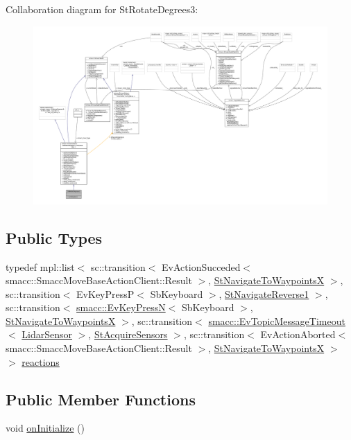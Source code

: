 Collaboration diagram for St\+Rotate\+Degrees3\+:
\nopagebreak
\begin{figure}[H]
\begin{center}
\leavevmode
\includegraphics[width=350pt]{structStRotateDegrees3__coll__graph}
\end{center}
\end{figure}
\subsection*{Public Types}
\begin{DoxyCompactItemize}
\item 
typedef mpl\+::list$<$ sc\+::transition$<$ Ev\+Action\+Succeded$<$ smacc\+::\+Smacc\+Move\+Base\+Action\+Client\+::\+Result $>$, \hyperlink{structStNavigateToWaypointsX}{St\+Navigate\+To\+WaypointsX} $>$, sc\+::transition$<$ Ev\+Key\+PressP$<$ Sb\+Keyboard $>$, \hyperlink{structStNavigateReverse1}{St\+Navigate\+Reverse1} $>$, sc\+::transition$<$ \hyperlink{structsmacc_1_1EvKeyPressN}{smacc\+::\+Ev\+Key\+PressN}$<$ Sb\+Keyboard $>$, \hyperlink{structStNavigateToWaypointsX}{St\+Navigate\+To\+WaypointsX} $>$, sc\+::transition$<$ \hyperlink{structsmacc_1_1EvTopicMessageTimeout}{smacc\+::\+Ev\+Topic\+Message\+Timeout}$<$ \hyperlink{sensor__state_8h_a9db9e1944f88de79507758d08e4a2ee3}{Lidar\+Sensor} $>$, \hyperlink{structStAcquireSensors}{St\+Acquire\+Sensors} $>$, sc\+::transition$<$ Ev\+Action\+Aborted$<$ smacc\+::\+Smacc\+Move\+Base\+Action\+Client\+::\+Result $>$, \hyperlink{structStNavigateToWaypointsX}{St\+Navigate\+To\+WaypointsX} $>$ $>$ \hyperlink{structStRotateDegrees3_a73a15fc4684d5a77b624ec65e58ffbbb}{reactions}
\end{DoxyCompactItemize}
\subsection*{Public Member Functions}
\begin{DoxyCompactItemize}
\item 
void \hyperlink{structStRotateDegrees3_a9a69cfa8a8193207068ae828ee0f6c97}{on\+Initialize} ()
\end{DoxyCompactItemize}
